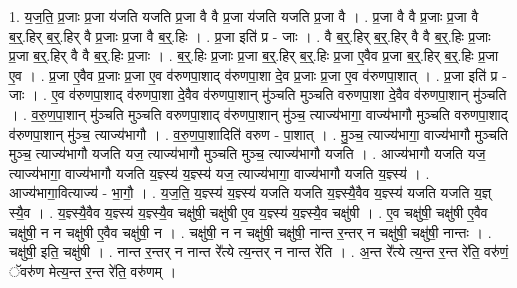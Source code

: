 \documentclass[17pt]{extarticle}
\begin{document}
1. य॒ज॒ति॒ प्र॒जाः प्र॒जा य॑जति यजति प्र॒जा वै वै प्र॒जा य॑जति यजति प्र॒जा वै । . प्र॒जा वै वै प्र॒जाः प्र॒जा वै ब॒र्॒.हिर् ब॒र्॒.हिर् वै प्र॒जाः प्र॒जा वै ब॒र्॒.हिः । . प्र॒जा इति॑ प्र - जाः । . वै ब॒र्॒.हिर् ब॒र्॒.हिर् वै वै ब॒र्॒.हिः प्र॒जाः प्र॒जा ब॒र्॒.हिर् वै वै ब॒र्॒.हिः प्र॒जाः । . ब॒र्॒.हिः प्र॒जाः प्र॒जा ब॒र्॒.हिर् ब॒र्॒.हिः प्र॒जा ए॒वैव प्र॒जा ब॒र्॒.हिर् ब॒र्॒.हिः प्र॒जा ए॒व । . प्र॒जा ए॒वैव प्र॒जाः प्र॒जा ए॒व व॑रुणपा॒शाद् व॑रुणपा॒शा दे॒व प्र॒जाः प्र॒जा ए॒व व॑रुणपा॒शात् । . प्र॒जा इति॑ प्र - जाः । . ए॒व व॑रुणपा॒शाद् व॑रुणपा॒शा दे॒वैव व॑रुणपा॒शान् मु॑ञ्चति मुञ्चति वरुणपा॒शा दे॒वैव व॑रुणपा॒शान् मु॑ञ्चति । . व॒रु॒ण॒पा॒शान् मु॑ञ्चति मुञ्चति वरुणपा॒शाद् व॑रुणपा॒शान् मु॑ञ्च॒ त्याज्य॑भागा॒ वाज्य॑भागौ मुञ्चति वरुणपा॒शाद् व॑रुणपा॒शान् मु॑ञ्च॒ त्याज्य॑भागौ । . व॒रु॒ण॒पा॒शादिति॑ वरुण - पा॒शात् । . मु॒ञ्च॒ त्याज्य॑भागा॒ वाज्य॑भागौ मुञ्चति मुञ्च॒ त्याज्य॑भागौ यजति यज॒ त्याज्य॑भागौ मुञ्चति मुञ्च॒ त्याज्य॑भागौ यजति । . आज्य॑भागौ यजति यज॒ त्याज्य॑भागा॒ वाज्य॑भागौ यजति य॒ज्ञ्स्य॑ य॒ज्ञ्स्य॑ यज॒ त्याज्य॑भागा॒ वाज्य॑भागौ यजति य॒ज्ञ्स्य॑ । . आज्य॑भागा॒वित्याज्य॑ - भा॒गौ॒ । . य॒ज॒ति॒ य॒ज्ञ्स्य॑ य॒ज्ञ्स्य॑ यजति यजति य॒ज्ञ्स्यै॒वैव य॒ज्ञ्स्य॑ यजति यजति य॒ज्ञ् स्यै॒व । . य॒ज्ञ्स्यै॒वैव य॒ज्ञ्स्य॑ य॒ज्ञ्स्यै॒व चक्षु॑षी॒ चक्षु॑षी ए॒व य॒ज्ञ्स्य॑ य॒ज्ञ्स्यै॒व चक्षु॑षी । . ए॒व चक्षु॑षी॒ चक्षु॑षी ए॒वैव चक्षु॑षी॒ न न चक्षु॑षी ए॒वैव चक्षु॑षी॒ न । . चक्षु॑षी॒ न न चक्षु॑षी॒ चक्षु॑षी॒ नान्त र॒न्तर् न चक्षु॑षी॒ चक्षु॑षी॒ नान्तः । . चक्षु॑षी॒ इति॒ चक्षु॑षी । . नान्त र॒न्तर् न नान्त रे᳚त्ये त्य॒न्तर् न नान्त रे॑ति । . अ॒न्त रे᳚त्ये त्य॒न्त र॒न्त रे॑ति॒ वरु॑णं॒ ॅवरु॑ण मेत्य॒न्त र॒न्त रे॑ति॒ वरु॑णम् । \newline
\end{document}
